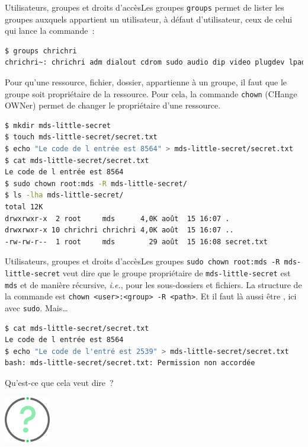 \documentclass{beamer}
\begin{document}
    \begin{frame}[fragile]{Utilisateurs, groupes et droits d'accès}{Les groupes}
        \lstinline{groups} permet de lister les groupes auxquels appartient un utilisateur, à défaut d'utilisateur, ceux de celui qui lance la commande~:
        \begin{lstlisting}[language=bash,basicstyle=\tiny\ttfamily]
$ groups chrichri
chrichri~: chrichri adm dialout cdrom sudo audio dip video plugdev lpadmin pulse lxd sambashare nordvpn docker libvirt
        \end{lstlisting}
        Pour qu'une ressource, fichier, dossier, appartienne à un groupe, il faut que le groupe soit propriétaire de la ressource.
        Pour cela, la commande \lstinline{chown} (CHange OWNer) permet de changer le propriétaire d'une ressource.
        \begin{lstlisting}[language=bash,basicstyle=\tiny\ttfamily]
$ mkdir mds-little-secret
$ touch mds-little-secret/secret.txt
$ echo "Le code de l entrée est 8564" > mds-little-secret/secret.txt
$ cat mds-little-secret/secret.txt
Le code de l entrée est 8564
$ sudo chown root:mds -R mds-little-secret/
$ ls -lha mds-little-secret/
total 12K
drwxrwxr-x  2 root     mds      4,0K août  15 16:07 .
drwxrwxr-x 10 chrichri chrichri 4,0K août  15 16:07 ..
-rw-rw-r--  1 root     mds        29 août  15 16:08 secret.txt
        \end{lstlisting}
    \end{frame}

    \begin{frame}[fragile]{Utilisateurs, groupes et droits d'accès}{Les groupes}
        \lstinline{sudo chown root:mds -R mds-little-secret} veut dire que le groupe propriétaire de \lstinline{mds-little-secret} est \lstinline{mds} et de manière récursive, \textit{i.e.}, pour les sous-dossiers et fichiers.
        La structure de la commande est \lstinline{chown <user>:<group> -R <path>}.
        Et il faut là aussi être , ici avec \lstinline{sudo}.
        \bigbreak
        Mais\ldots
        \begin{lstlisting}[language=bash]
$ cat mds-little-secret/secret.txt
Le code de l entrée est 8564
$ echo "Le code de l'entré est 2539" > mds-little-secret/secret.txt
bash: mds-little-secret/secret.txt: Permission non accordée
        \end{lstlisting}
        Qu'est-ce que cela veut dire~?
        \begin{center}
            \includegraphics[width=2cm]{image/question-mark}
        \end{center}
    \end{frame}
\end{document}
